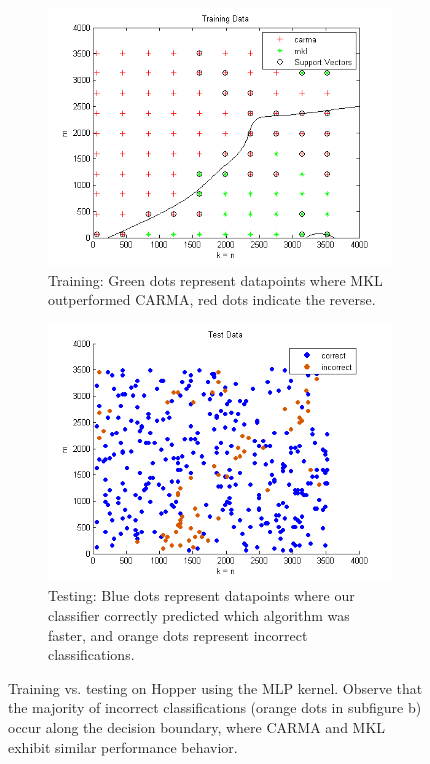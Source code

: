 \begin{figure}[t]
    \centering
        \begin{subfigure}[t]{0.49\textwidth}
            \includegraphics[width=\textwidth]{figures/hopper2D_train_mlp.png}
            \caption{Training: Green dots represent datapoints where MKL outperformed CARMA, red dots indicate the reverse.}
            \label{f:train_hopper_2D}
            \end{subfigure}
        \begin{subfigure}[t]{0.49\textwidth}
            \includegraphics[width=\textwidth]{figures/hopper2D_test_mlp.png}
            \caption{Testing: Blue dots represent datapoints where our classifier correctly predicted which algorithm was faster, and orange dots represent incorrect classifications.}
            \label{f:test_hopper_2D}
        \end{subfigure}
        \caption{Training vs. testing on Hopper using the MLP kernel. Observe that the majority of incorrect classifications (orange dots in subfigure b) occur along the decision boundary, where CARMA and MKL exhibit similar performance behavior.}
    \label{fig:2D}
\end{figure}


